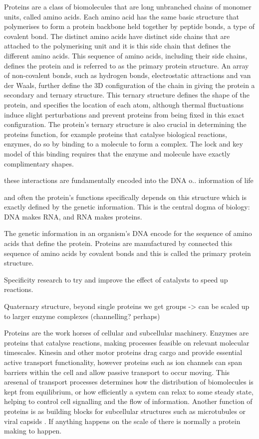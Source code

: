 Proteins are a class of biomolecules that are long unbranched chains of monomer units, called amino acids. \cite{jones2002soft} Each amino acid has the same basic structure that polymerises to form a protein backbone held together by peptide bonds, a type of covalent bond. The distinct amino acids have distinct side chains that are attached to the polymerising unit and it is this side chain that defines the different amino acids. This sequence of amino acids, including their side chains, defines the protein and is referred to as the primary protein structure. An array of non-covalent bonds, such as hydrogen bonds, electrostatic attractions and van der Waals, further define the 3D configuration of the chain in giving the protein a secondary and ternary structure. This ternary structure defines the shape of the protein,  and specifies the location of each atom, although thermal fluctuations induce slight perturbations and prevent proteins from being fixed in this exact configuration. The protein's ternary structure is also crucial in determining the proteins function, for example proteins that catalyse biological reactions, enzymes, do so by binding to a molecule to form a complex. The lock and key model of this binding requires that the enzyme and molecule have exactly complimentary shapes.

these interactions are fundamentally encoded into the DNA o.. information of life

and often the protein's functions specifically depends on this structure which is exactly defined by the genetic information. This is the central dogma of biology: DNA makes RNA, and RNA makes proteins.

The genetic information in an organism's DNA encode for the sequence of amino acids that define the protein. Proteins are manufactured by connected this sequence of amino acids by covalent bonds and this is called the primary protein structure.

Specificity research to try and improve the effect of catalysts to speed up reactions.

Quaternary structure, beyond single proteins we get groups -> can be scaled up to larger enzyme complexes (channelling? perhaps)

Proteins are the work horses of cellular and subcellular machinery. Enzymes are proteins that catalyse reactions, making processes feasible on relevant molecular timescales. Kinesin and other motor proteins drag cargo and provide essential active transport functionality, however proteins such as ion channels can span barriers within the cell and allow passive transport to occur moving. This aresenal of transport processes determines how the distribution of biomolecules is kept from equilibrium, or how efficiently a system can relax to some steady state, helping to control cell signalling and the flow of information. Another function of proteins is as building blocks for subcellular structures such as microtubules or viral capsids \cite{keskin_principles_2008}. If anything happens on the scale of  there is normally a protein making to happen.

